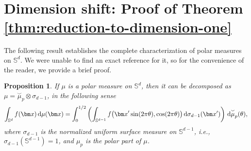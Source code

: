 \documentclass[reqno, a4paper]{amsart}
\def\SS{\mathbb{S}}
\renewcommand{\d}{\text{\rm d}}
\newcommand{\Sd}{\mathbb{S}^d}
\newcommand{\x}{{\bm x}}
\newcommand{\muarc}{\overset{\smallsmile}{\mu}}
\theoremstyle{plain}
\newtheorem{proposition}[theorem]{Proposition}
\theoremstyle{definition}
\theoremstyle{remarkstyle}
\numberwithin{equation}{section}
\begin{document}
\section{Dimension shift: Proof of Theorem \ref{thm:reduction-to-dimension-one}}\label{sec:dimension-shift}
The following result establishes the complete characterization of polar measures on $\Sd$.
We were unable to find an exact reference for it, so for the convenience of the reader, we provide a brief proof.
\begin{proposition}\label{prop:decomposition-for-polar-measures}
    If $\mu$ is a polar measure on $\Sd$, then it can be decomposed as $\mu =\muarc_p \otimes \sigma_{d-1}$, in the following sense
    \begin{equation*}\label{eq:disintegration identity as defintion}
        \int_{\Sd} f(\bm x)\, \d\mu(\bm x)= \int_{0}^{1/2}\left(\int_{\mathbb{S}^{d-1}} f\bigl(\x'\sin(2\pi \theta), \cos(2\pi \theta)\bigr)\,\d\sigma_{d-1}(\bm x')\right)\, \d\muarc_p(\theta),
    \end{equation*}
    where $\sigma_{d-1}$ is the normalized uniform surface measure on $\mathbb{S}^{d-1}$, i.e., $\sigma_{d-1}(\SS^{d-1})=1$, and $\mu_p$ is the polar part of $\mu$.

\end{proposition}
\end{document}

